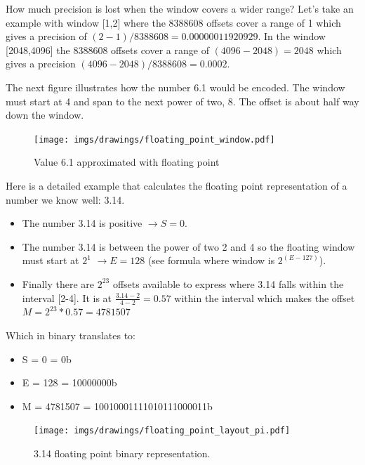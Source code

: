 \documentclass[book.tex]{subfiles}
\begin{document}
\par {} How much precision is lost when the window covers a wider range? Let's take an example with window [1,2] where the 8388608 offsets cover a range of 1 which gives a precision of $(2-1)/8388608=0.00000011920929$. In the window [2048,4096] the 8388608 offsets cover a range of $(4096-2048) = 2048$ which gives a precision $ (4096-2048)/8388608=0.0002$.\\
\par

The next figure illustrates how the number 6.1 would be encoded. The window must start at 4 and span to the next power of two, 8. The offset is about half way down the window.

\begin{figure}[H]
\centering
\texttt{[image: imgs/drawings/floating\_point\_window.pdf]}

\caption{Value 6.1 approximated with floating point}
\label{fig:fp_internals_window6_1}
\end{figure}
  \bigskip
  
Here is a detailed example that calculates the floating point representation of a number we know well: 3.14.
\begin{itemize}
 \item The number 3.14 is positive  $\rightarrow S=0$.
 \item The number 3.14 is between the power of two 2 and 4 so the floating window must start at $2^1$  $\rightarrow E=128$ (see formula where window is $2^{(E-127)}$).
 \item Finally there are $2^{23}$ offsets available to express where 3.14 falls within the interval [2-4]. It is at $\frac{3.14 -2 }{4 - 2} = 0.57$ within the interval which makes the offset $ M = 2^{23}*0.57 = 4781507$
\end{itemize}

Which in binary translates to:

\begin{itemize}
\item S = 0 = 0b
\item E = 128 = 10000000b
\item M = 4781507 = 10010001111010111000011b
\end{itemize}

\begin{figure}[H]
\centering
\texttt{[image: imgs/drawings/floating\_point\_layout\_pi.pdf]}
\caption{3.14 floating point binary representation.}
\label{fig:fp_internals}
\end{figure}
  \bigskip
\end{document}

